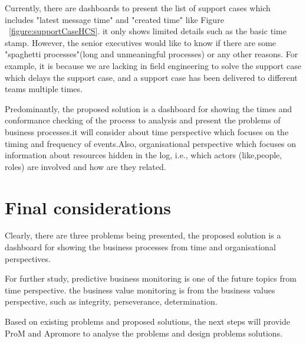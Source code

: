 Currently, there are dashboards to present the list of support cases which includes "latest message time" and "created time" like Figure ~\ref{figure:supportCaseHCS}. it only shows limited details such as the basic time stamp. However, the senior executives would like to know if there are some "spaghetti processes"(long and unmeaningful processes) or any other reasons. For example, it is because we are lacking in field engineering to solve the support case which delays the support case, and a support case has been delivered to different teams multiple times.

Predominantly, the proposed solution is a dashboard for showing the times  and conformance checking of the process to analysis and present the problems of business processes.it will consider about time perspective which focuses on the timing and frequency of events.Also, organisational perspective which focuses on information about resources hidden in the log, i.e., which actors (like,people, roles) are involved and how are they related.


\section{Final considerations} 

Clearly, there are three problems being presented, the proposed solution is a dashboard for showing the business processes from time and organisational perspectives.

For further study, predictive business monitoring is one of the future topics from time perspective. the business value monitoring is from the business values perspective, such as integrity, perseverance, determination.

Based on existing problems and proposed solutions, the next steps will provide ProM and Apromore to analyse the problems and design problems solutions.